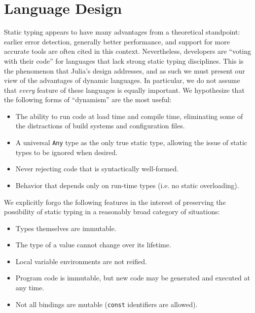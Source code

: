 \documentclass[9pt]{sigplanconf}
\begin{document}

\section{Language Design}


Static typing appears to have many advantages from a theoretical
standpoint: earlier error detection, generally better performance, and
support for more accurate tools are often cited in this context.
Nevertheless, developers are ``voting with their code'' for languages that
lack strong static typing disciplines. This is the phenomenon that Julia's
design addresses, and as such we must present our view of the advantages of
dynamic languages. In particular, we do not assume that \emph{every}
feature of these languages is equally important.
We hypothesize that the following forms of ``dynamism'' are
the most useful:

\begin{itemize}
\item The ability to run code at load time and compile time, eliminating
some of the distractions of build systems and configuration files.
\item A universal {\tt Any} type as the only true static type,
allowing the issue of static types to be ignored when desired.
\item Never rejecting code that is syntactically well-formed.
\item Behavior that depends only on run-time types (i.e. no static overloading).
\end{itemize}

We explicitly forgo the following features in the interest of preserving
the possibility of static typing in a reasonably broad category of
situations:

\begin{itemize}
\item Types themselves are immutable.
\item The type of a value cannot change over its lifetime.
\item Local variable environments are not reified.
\item Program code is immutable, but new code may be generated and executed at any time.
\item Not all bindings are mutable ({\tt const} identifiers are allowed).
\end{itemize}
\end{document}
